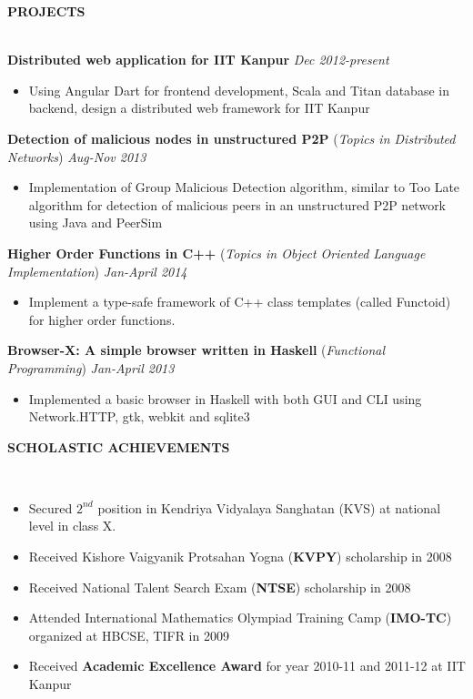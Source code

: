 \documentclass[10pt]{article}
\newcommand{\cvsectiontitle}[1]{
    		\colorbox{gray!40}{%
        \begin{minipage}{0.989\linewidth}%
            \vspace*{1pt}%
            \large\indent\textbf{#1}
            \vspace*{1pt}%
        \end{minipage}%
   		}\\[1mm]
		}
\begin{document}
\cvsectiontitle{PROJECTS}
\textbf{Distributed web application for IIT Kanpur} \hfill \textit{Dec 2012-present}
\vspace{-0.2cm}
\begin{itemize}
	\item Using Angular Dart for frontend development, Scala and Titan database in backend, design a distributed web framework for IIT Kanpur
\end{itemize}
\textbf{Detection of malicious nodes in unstructured P2P} (\textit{Topics in Distributed Networks}) \hfill \textit{Aug-Nov 2013}
\vspace{-0.2cm}
\begin{itemize}
	\item Implementation of Group Malicious Detection algorithm, similar to Too Late algorithm for detection of malicious peers in an unstructured P2P network using Java and PeerSim
\end{itemize}
\textbf{Higher Order Functions in C++} (\textit{Topics in Object Oriented Language Implementation}) \hfill \textit{Jan-April 2014}
\vspace{-0.2cm}
\begin{itemize}
	\item Implement a type-safe framework of C++ class templates (called Functoid) for higher order functions.
\end{itemize}
\textbf{Browser-X: A simple browser written in Haskell} (\textit{Functional Programming}) \hfill \textit{Jan-April 2013}
\vspace{-0.2cm}
\begin{itemize}
	\item Implemented a basic browser in Haskell with both GUI and CLI using Network.HTTP, gtk, webkit and sqlite3
\end{itemize}

\cvsectiontitle{SCHOLASTIC ACHIEVEMENTS}
\vspace{-0.6cm}
\begin{itemize}[leftmargin=0.5cm]
\item Secured $2^{nd}$ position in Kendriya Vidyalaya Sanghatan (KVS) at national level in class X.
\item Received Kishore Vaigyanik Protsahan Yogna (\textbf{KVPY}) scholarship in 2008
\item Received National Talent Search Exam (\textbf{NTSE}) scholarship in 2008
\item Attended International Mathematics Olympiad Training Camp (\textbf{IMO-TC}) organized at HBCSE, TIFR in 2009
\item Received \textbf{Academic Excellence Award} for year 2010-11 and 2011-12 at IIT Kanpur
\end{itemize}
\end{document}

